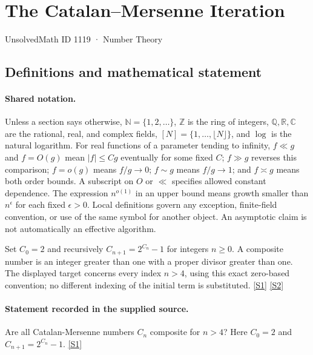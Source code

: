 \documentclass[11pt,a4paper]{article}
\newcommand{\N}{\mathbb{N}}
\newcommand{\Z}{\mathbb{Z}}
\newcommand{\Q}{\mathbb{Q}}
\newcommand{\R}{\mathbb{R}}
\newcommand{\C}{\mathbb{C}}
\newcommand{\sref}[2]{\hyperlink{source:#1:#2}{[S#2]}}
\begin{document}

\setcounter{section}{1118}

\section{The Catalan--Mersenne Iteration}\label{1119}

{\small\sffamily UnsolvedMath ID 1119 · Number Theory}

\subsection{Definitions and mathematical statement}

\paragraph{Shared notation.}Unless a section says otherwise, $\N=\{1,2,\ldots\}$,
$\Z$ is the ring of integers, $\Q,\R,\C$ are the rational, real, and complex
fields, $[N]=\{1,\ldots,\lfloor N\rfloor\}$, and $\log$ is the natural
logarithm. For real functions of a parameter tending to infinity,
$f\ll g$ and $f=O(g)$ mean $|f|\leq Cg$ eventually for some fixed $C$;
$f\gg g$ reverses this comparison; $f=o(g)$ means $f/g\to0$;
$f\sim g$ means $f/g\to1$; and $f\asymp g$ means both order bounds.
A subscript on $O$ or $\ll$ specifies allowed constant dependence.
The expression $n^{o(1)}$ in an upper bound means growth smaller than
$n^\epsilon$ for each fixed $\epsilon>0$. Local definitions govern any
exception, finite-field convention, or use of the same symbol for another
object. An asymptotic claim is not automatically an effective algorithm.



Set $C_0=2$ and recursively $C_{n+1}=2^{C_n}-1$ for integers $n\geq0$. A composite number is an integer greater than one with a proper divisor greater than one. The displayed target concerns every index $n>4$, using this exact zero-based convention; no different indexing of the initial term is substituted. \sref{1119}{1} \sref{1119}{2}

\paragraph{Statement recorded in the supplied source.}
Are all Catalan-Mersenne numbers $C_n$ composite for $n > 4$? Here $C_0 = 2$ and $C_{n+1} = 2^{C_n} - 1$. \sref{1119}{1}
\end{document}
